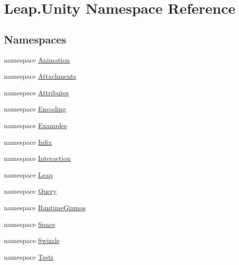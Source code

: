 \hypertarget{namespace_leap_1_1_unity}{}\section{Leap.\+Unity Namespace Reference}
\label{namespace_leap_1_1_unity}
\subsection*{Namespaces}
\begin{DoxyCompactItemize}
\item 
namespace \mbox{\hyperlink{namespace_leap_1_1_unity_1_1_animation}{Animation}}
\item 
namespace \mbox{\hyperlink{namespace_leap_1_1_unity_1_1_attachments}{Attachments}}
\item 
namespace \mbox{\hyperlink{namespace_leap_1_1_unity_1_1_attributes}{Attributes}}
\item 
namespace \mbox{\hyperlink{namespace_leap_1_1_unity_1_1_encoding}{Encoding}}
\item 
namespace \mbox{\hyperlink{namespace_leap_1_1_unity_1_1_examples}{Examples}}
\item 
namespace \mbox{\hyperlink{namespace_leap_1_1_unity_1_1_infix}{Infix}}
\item 
namespace \mbox{\hyperlink{namespace_leap_1_1_unity_1_1_interaction}{Interaction}}
\item 
namespace \mbox{\hyperlink{namespace_leap_1_1_unity_1_1_leap}{Leap}}
\item 
namespace \mbox{\hyperlink{namespace_leap_1_1_unity_1_1_query}{Query}}
\item 
namespace \mbox{\hyperlink{namespace_leap_1_1_unity_1_1_runtime_gizmos}{Runtime\+Gizmos}}
\item 
namespace \mbox{\hyperlink{namespace_leap_1_1_unity_1_1_space}{Space}}
\item 
namespace \mbox{\hyperlink{namespace_leap_1_1_unity_1_1_swizzle}{Swizzle}}
\item 
namespace \mbox{\hyperlink{namespace_leap_1_1_unity_1_1_tests}{Tests}}
\end{DoxyCompactItemize}

